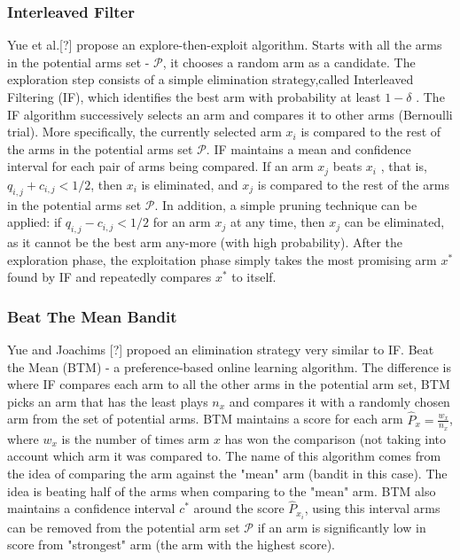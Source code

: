 \documentclass{llncs}
\begin{document}
\subsubsection{Interleaved Filter}
	Yue et al.[?] propose an explore-then-exploit algorithm.
	Starts with all the arms in the potential arms set - $\mathcal{P}$, it chooses a random arm as a candidate. 
	The exploration step consists of a simple elimination strategy,called Interleaved Filtering (IF), which identifies the best arm with probability at least $1-\delta $ . 
	The IF algorithm successively selects an arm and compares it to other arms (Bernoulli trial). 
	More specifically, the currently selected arm $x_i$ is compared to the rest of the arms in the potential arms set $\mathcal{P}$.
	IF maintains a mean and confidence interval for each pair of arms being compared. 
	If an arm $x_j$ beats $x_i$ , that is, $q_{i,j}+c_{i,j}<1/2$, then $x_i$ is eliminated, and $x_j$ is compared to the rest of the arms in the potential arms set $\mathcal{P}$.
	In addition, a simple pruning technique can be applied: if $q_{i,j}-c_{i,j}<1/2$ for an arm $x_j$ at any time, then $x_j$ can be eliminated, as it cannot be the best arm any-more (with high probability). 
	After the exploration phase, the exploitation phase simply takes the most promising arm $x^*$ found by IF and repeatedly compares $x^*$ to itself.	
	
	

\newpage

\subsubsection{Beat The Mean Bandit}	
	Yue and Joachims [?] propoed an elimination strategy very similar to IF. Beat the Mean (BTM) - a preference-based online learning algorithm. 
	The difference is where IF compares each arm to all the other arms in the potential arm set, BTM picks an arm that has the least plays $n_x$ and compares it with a randomly chosen arm from the set of potential arms.
	BTM maintains a score for each arm $\hat{P}_{x} = \frac{w_x}{n_x}$, where $w_x$ is the number of times arm $x$ has won the comparison (not taking into account which arm it was compared to.
	The name of this algorithm comes from the idea of comparing the arm against the "mean" arm (bandit in this case).
	The idea is beating half of the arms when comparing to the "mean" arm. 
	BTM also maintains a confidence interval $c^*$ around the score	$\hat{P}_{x_i}$, using this interval arms can be removed from the potential arm set $\mathcal{P}$ if an arm is significantly low in score from "strongest" arm (the arm with the highest score).
	
\end{document}
